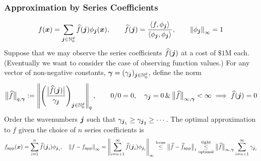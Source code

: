 \documentclass[11pt,compress,xcolor={usenames,dvipsnames},aspectratio=169]{beamer}
\newcommand{\fappx}{f_{\text{app}}}
\newcommand{\hfappx}{\widehat{f}_{\text{app}}}
\begin{document}
\begin{frame}[label=ApproxFourier]
\frametitle{Approximation by Series Coefficients}
\vspace{-6ex}
\begin{equation*}
f(\vx) = \sum_{\vj \in \natzero^d} \hf(\vj) \phi_{\vj}(\vx), \qquad  \hf(\vj) = \frac{\ip{f}{\phi_{\vj}}}{\ip{\phi_{\vj}}{\phi_{\vj}}},  \qquad \norm[\infty]{\phi_{\vj}} = 1
\end{equation*}
Suppose that we may observe the series coefficients $\hf(\vj)$ at a cost of $\$1$M each. (\alert{Eventually we want to consider the case of observing function values.})  For any vector of non-negative constants, $\vgamma = (\gamma_{\vj})_{\vj \in \natzero^d}$, define the norm
\[
\bignorm[q,\vgamma]{\hf} := \norm[q]{\left( \frac{\bigabs{\hf(\vj)}}{\gamma_{\vj}} \right)_{\vj \in \natzero^d}}, \qquad 0/0 = 0,\quad  \gamma_{\vj} = 0 \, \& \, \bignorm[\infty,\vgamma]{\hf} < \infty \implies \hf(\vj)= 0
\]
Order the wavenumbers $\vj$ such that $\gamma_{\vj_1} \ge \gamma_{\vj_2} \ge \cdots$.  The \alert{optimal} approximation 
to $f$ given the choice of $n$ series coefficients  is 
\begin{equation*}
\fappx(\vx) = \sum_{i=1}^{n} \hf(\vj_i) \phi_{\vj_i}, \quad \norm[\infty]{f - \fappx} = \norm[\infty]{\sum_{i=n+1}^{\infty} \hf(\vj_i) \phi_{\vj_i} } 
\overset{\text{loose}}{\le}  \bignorm[1]{\hf - \hfappx} \underset{\text{optimal}}{\overset{\text{tight}}{\le}} \bignorm[\infty,\vgamma]{\hf} \sum_{i = n+1}^{\infty}  \gamma_{\vj_{i}}
\end{equation*}
\end{frame}
\end{document}
